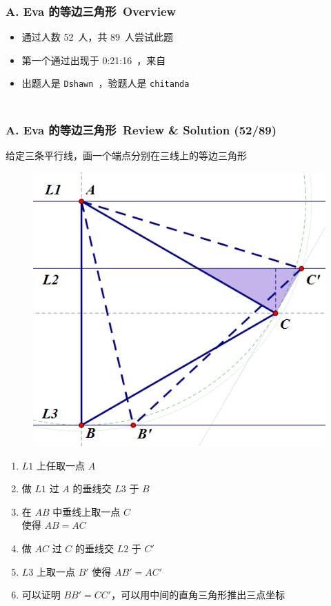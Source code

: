 \documentclass[notheorems]{beamer}
\newcommand{\zhProbA}{Eva 的等边三角形}	\newcommand{\DiffA}{Easy}		\newcommand{\AuthProbA}{\texttt{Dshawn}}		\newcommand{\TestProbA}{\texttt{chitanda}}
\newcommand{\AccInProbA}{52}	\newcommand{\SubInProbA}{89}	\newcommand{\RatInProbA}{58.43\%}
\newcommand{\FirPenInProbA}{0:21:16}		\newcommand{\FirPerInProbA}{\Someone}
\begin{document}
\begin{frame}[label = ProbA]
\frametitle{\\ A. \zhProbA\ Overview}
\begin{spacing}{2.0} \large
\begin{itemize}
\item 通过人数 \AccInProbA\ 人，共 \SubInProbA\ 人尝试此题
\item 第一个通过出现于 \FirPenInProbA\ ，来自 \FirPerInProbA\ 
\item 出题人是 \AuthProbA\ ，验题人是 \TestProbA\
\end{itemize}
\end{spacing}
\end{frame}
\begin{frame}
\frametitle{\\ A. \zhProbA\ Review \& Solution (\AccInProbA/\SubInProbA)}
\begin{spacing}{1.5} \large
\noindent 给定三条平行线，画一个端点分别在三线上的等边三角形 \pause
\begin{figure}
\vspace{0.8cm}
\includegraphics[scale=0.25]{A.png}
\end{figure}
\vspace{-0.8cm}
\begin{enumerate}[1.]
\item $L1$ 上任取一点 $A$
\item 做 $L1$ 过 $A$ 的垂线交 $L3$ 于 $B$
\item 在 $AB$ 中垂线上取一点 $C$ \\ 使得 $AB = AC$
\item 做 $AC$ 过 $C$ 的垂线交 $L2$ 于 $C'$
\item $L3$ 上取一点 $B'$ 使得 $AB' = AC'$
\item 可以证明 $BB' = CC'$，可以用中间的直角三角形推出三点坐标
\end{enumerate}
\end{spacing}
\end{frame}
\end{document}

